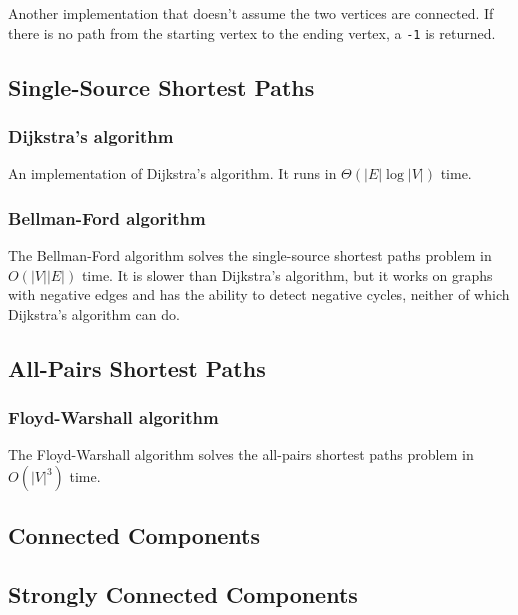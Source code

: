 \documentclass[8pt,a4paper]{amsart}
\begin{document}
Another implementation that doesn't assume the two vertices are connected. If
there is no path from the starting vertex to the ending vertex, a
\lstinline$-1$ is returned.



\subsection{Single-Source Shortest Paths}
\subsubsection{Dijkstra's algorithm}
An implementation of Dijkstra's algorithm. It runs in $\Theta(|E|\log{|V|})$
time.


\subsubsection{Bellman-Ford algorithm}
The Bellman-Ford algorithm solves the single-source shortest paths problem in
$O(|V||E|)$ time. It is slower than Dijkstra's algorithm, but it works on
graphs with negative edges and has the ability to detect negative cycles,
neither of which Dijkstra's algorithm can do.

\subsection{All-Pairs Shortest Paths}
\subsubsection{Floyd-Warshall algorithm}
The Floyd-Warshall algorithm solves the all-pairs shortest paths problem in
$O(|V|^3)$ time.

\subsection{Connected Components}
\subsection{Strongly Connected Components}
\end{document}
